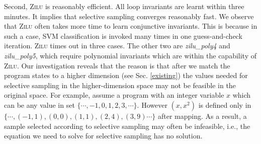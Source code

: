 

Second, \textsc{Zilu} is reasonably efficient. All loop invariants are learnt within three minutes.
It implies that selective sampling converges reasonably fast.
We observe that \textsc{Zilu} often takes more time to learn conjunctive invariants.
This is because in such a case, SVM classification is invoked many times in one guess-and-check iteration. \textsc{Zilu} times out in three cases. 
The other two are \emph{zilu\_poly4} and \emph{zilu\_poly5}, which require polynomial invariants which are within the capability of \textsc{Zilu}.
Our investigation reveals that the reason is that after we match the program states to a higher dimension (see Sec. \ref{existing})
the values needed for selective sampling in the higher-dimension space may not be feasible in the original space.
For example, assume a program with an integer variable $\mathit{x}$ which can be any value in set $\mathit{\{\cdots, -1, 0,  1, 2, 3, \cdots\}}$.
However $\mathit{(x, x^2)}$ is defined only in $\mathit{\{\cdots, (-1,1), (0,0), (1,1), (2, 4), (3, 9) \cdots\}}$ after mapping.
As a result, a sample selected according to selective sampling may often be infeasible, i.e., the equation we need to solve for selective sampling has no solution.


